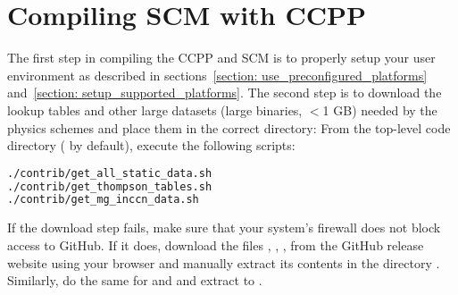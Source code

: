 \section{Compiling SCM with CCPP}
\label{section: compiling}
The first step in compiling the CCPP and SCM is to properly setup your user environment as described in sections~\ref{section: use_preconfigured_platforms} and~\ref{section: setup_supported_platforms}. The second step is to download the lookup tables and other large datasets (large binaries, $<$1 GB) needed by the physics schemes and place them in the correct directory:
From the top-level code directory ( by default), execute the following scripts:
\begin{lstlisting}[language=bash]
./contrib/get_all_static_data.sh
./contrib/get_thompson_tables.sh
./contrib/get_mg_inccn_data.sh
\end{lstlisting}
If the download step fails, make sure that your system's firewall does not block access to GitHub. If it does, download the files , , ,  from the GitHub release website using your browser and manually extract its contents in the directory . Similarly, do the same for   and  and extract to . 

